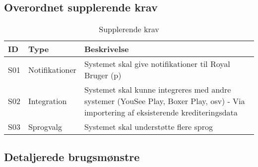 \subsection{Overordnet supplerende krav}
\begin{table}[H]
\centering
\begin{tabular}{ |p{2cm}|p{2.5cm}|p{7cm}| }
\hline
\textbf{ID} & \textbf{Type} & \textbf{Beskrivelse} \\
\hline
S01 & Notifikationer & Systemet skal give notifikationer til Royal Bruger (p) \\
\hline
S02 & Integration & Systemet skal kunne integreres med andre systemer (YouSee Play, Boxer Play, osv) - Via importering af eksisterende krediteringsdata \\
\hline
S03 & Sprogvalg & Systemet skal understøtte flere sprog \\ 
\hline
\end{tabular}
\caption{Supplerende krav}
\label{table:1}
\end{table}




\subsection{Detaljerede brugsmønstre}

